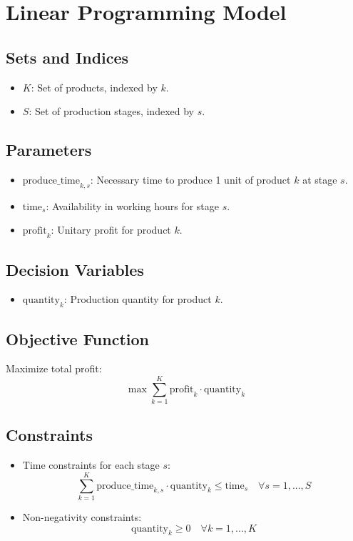 \documentclass{article}
\begin{document}
\section*{Linear Programming Model}

\subsection*{Sets and Indices}
\begin{itemize}
    \item \( K \): Set of products, indexed by \( k \).
    \item \( S \): Set of production stages, indexed by \( s \).
\end{itemize}

\subsection*{Parameters}
\begin{itemize}
    \item \( \text{produce\_time}_{k,s} \): Necessary time to produce 1 unit of product \( k \) at stage \( s \).
    \item \( \text{time}_{s} \): Availability in working hours for stage \( s \).
    \item \( \text{profit}_{k} \): Unitary profit for product \( k \).
\end{itemize}

\subsection*{Decision Variables}
\begin{itemize}
    \item \( \text{quantity}_{k} \): Production quantity for product \( k \).
\end{itemize}

\subsection*{Objective Function}
Maximize total profit:
\[
\max \sum_{k=1}^{K} \text{profit}_{k} \cdot \text{quantity}_{k}
\]

\subsection*{Constraints}
\begin{itemize}
    \item Time constraints for each stage \( s \):
    \[
    \sum_{k=1}^{K} \text{produce\_time}_{k,s} \cdot \text{quantity}_{k} \leq \text{time}_{s} \quad \forall s = 1,...,S
    \]
    \item Non-negativity constraints:
    \[
    \text{quantity}_{k} \geq 0 \quad \forall k = 1,...,K
    \]
\end{itemize}
\end{document}
